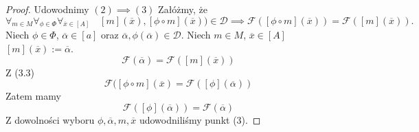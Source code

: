 \documentclass[12pt,a4paper]{report}
\newcommand{\domkniecie}[1]{\left\lbrack{#1}\right\rbrack}
\begin{document}
\begin{proof}
Udowodnimy $(2) \implies (3)$
Załóżmy, że
\begin{equation}
\forall_{m \in M}\forall_{\phi \in \Phi} \forall_{\overline{x} \in \domkniecie{A}} \quad \domkniecie{m}(\overline{x}),\domkniecie{\phi\circ m}(\overline{x})) \in \mathcal{D} \implies \mathcal{F}( \domkniecie{\phi \circ m}(\overline{x}))=\mathcal{F}(\domkniecie{m}(\overline{x})).
\end{equation}
Niech $\phi \in \Phi$, $\overline{\alpha} \in \domkniecie{a}$ oraz $\overline{\alpha}, \phi(\overline{\alpha})\in \mathcal{D}$. Niech $m \in M$, $\overline{x} \in \domkniecie{A}$ $\domkniecie{m}(\overline{x}):= \overline{\alpha}$. 
$$
 \mathcal{F}(\overline{\alpha})=\mathcal{F}(\domkniecie{m}(\overline{x}))
$$
Z (3.3)
$$
\mathcal{F}(\domkniecie{\phi \circ m}(\overline{x})=\mathcal{F}(\domkniecie{\phi}(\overline{\alpha}))
$$
Zatem mamy
$$
\mathcal{F}(\domkniecie{\phi}(\overline{\alpha}))=\mathcal{F}(\overline{\alpha})
$$
Z dowolności wyboru $\phi, \overline{\alpha}, m, \overline{x}$ udowodniliśmy punkt (3).
\end{proof}
\end{document}
